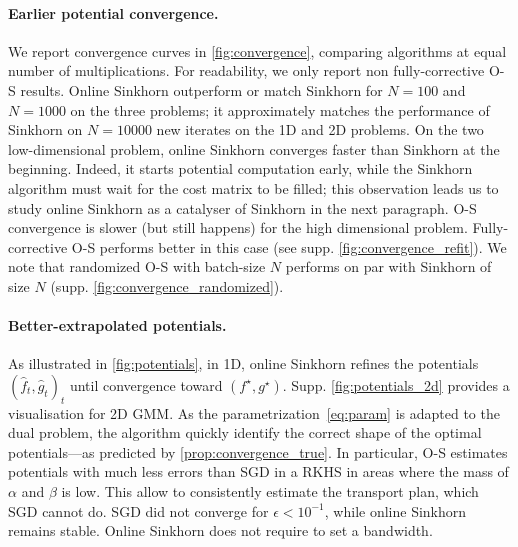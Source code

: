 \paragraph{Earlier potential convergence.} 
We report convergence curves in \autoref{fig:convergence}, comparing algorithms
at equal number of multiplications. For readability, we only report non
fully-corrective O-S results. Online Sinkhorn outperform or match Sinkhorn for $N=100$
and $N=1000$ on the three problems; it approximately matches the performance of
Sinkhorn on $N=10000$ new iterates on the 1D and 2D problems. On the two
low-dimensional problem, online Sinkhorn converges faster than Sinkhorn at the
beginning. Indeed, it starts potential computation early, while the Sinkhorn
algorithm must wait for the cost matrix to be filled;  this observation leads us
to study online Sinkhorn as a catalyser of Sinkhorn in the next paragraph. O-S
convergence is slower (but still happens) for the high dimensional problem.
Fully-corrective O-S performs better in this case (see supp. \autoref{fig:convergence_refit}). We note that
randomized O-S with batch-size $N$ performs on par with Sinkhorn of size $N$ (supp. \autoref{fig:convergence_randomized}).

\paragraph{Better-extrapolated potentials.} As illustrated in
\autoref{fig:potentials}, in 1D, online Sinkhorn refines the potentials $(\hat f_t, \hat g_t)_t$
until convergence toward $(f^\star, g^\star)$. Supp. \autoref{fig:potentials_2d} provides a visualisation for 2D GMM. As the parametrization~\eqref{eq:param} is 
adapted to the dual problem, the algorithm quickly identify the correct shape of
the optimal potentials---as predicted by \autoref{prop:convergence_true}. In
particular, O-S estimates potentials with much less errors than SGD in a RKHS in
areas where the mass of $\alpha$ and $\beta$ is low. This allow to consistently estimate the transport plan, which SGD cannot do. SGD did not converge
for $\epsilon < 10^{-1}$, while online Sinkhorn remains stable. Online
Sinkhorn does not require to set a bandwidth.


